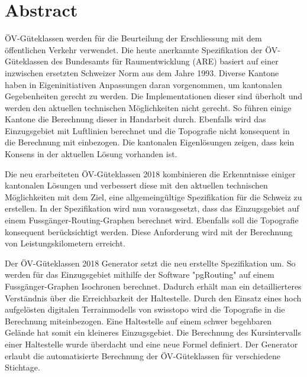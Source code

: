 
\chapter*{Abstract}
ÖV-Güteklassen werden für die Beurteilung der Erschliessung mit dem öffentlichen Verkehr verwendet.
Die heute anerkannte Spezifikation der ÖV-Güteklassen des Bundesamts für Raumentwicklung (ARE)  basiert auf einer inzwischen ersetzten Schweizer Norm aus dem Jahre 1993.
Diverse Kantone haben in Eigeninitiativen Anpassungen daran vorgenommen, um kantonalen Gegebenheiten gerecht zu werden.
Die Implementationen dieser sind überholt und werden den aktuellen technischen Möglichkeiten nicht gerecht.
So führen einige Kantone die Berechnung dieser in Handarbeit durch.
Ebenfalls wird das Einzugsgebiet mit Luftlinien berechnet und die Topografie nicht konsequent in die Berechnung mit einbezogen.
Die kantonalen Eigenlösungen zeigen, dass kein Konsens in der aktuellen Lösung vorhanden ist.

Die neu erarbeiteten ÖV-Güteklassen 2018 kombinieren die Erkenntnisse einiger kantonalen Lösungen und verbessert diese mit den aktuellen technischen Möglichkeiten mit dem Ziel, eine allgemeingültige Spezifikation für die Schweiz zu erstellen.
In der Spezifikation wird nun vorausgesetzt, dass das Einzugsgebiet auf einem Fussgänger-Routing-Graphen berechnet wird.
Ebenfalls soll die Topografie konsequent berücksichtigt werden.
Diese Anforderung wird mit der Berechnung von Leistungskilometern erreicht.

Der ÖV-Güteklassen 2018 Generator setzt die neu erstellte Spezifikation um.
So werden für das Einzugsgebiet mithilfe der Software "pgRouting" auf einem Fussgänger-Graphen Isochronen berechnet.
Dadurch erhält man ein detaillierteres Verständnis über die Erreichbarkeit der Haltestelle.
Durch den Einsatz eines hoch aufgelösten digitalen Terrainmodells von swisstopo wird die Topografie in die Berechnung miteinbezogen. Eine Haltestelle auf einem schwer begehbaren Gelände hat somit ein kleineres Einzugsgebiet.
Die Berechnung des Kursintervalls einer Haltestelle wurde überdacht und eine neue Formel definiert.
Der Generator erlaubt die automatisierte Berechnung der ÖV-Güteklassen für verschiedene Stichtage.

